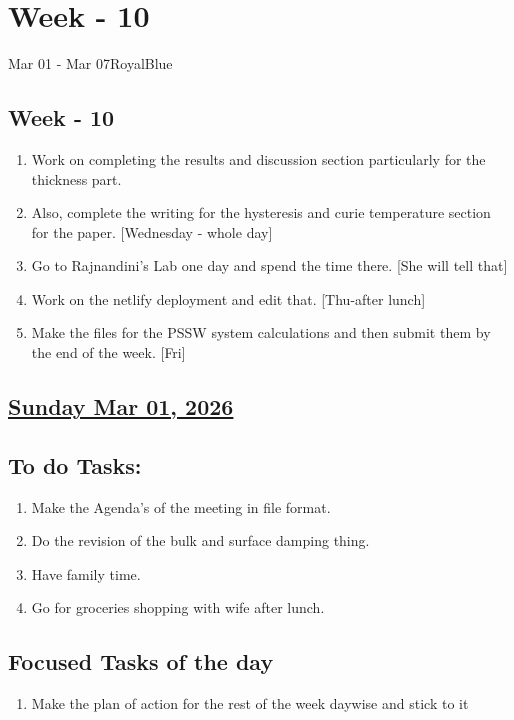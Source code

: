 \section{Week - 10}
\begin{physicsmodule}{Mar 01 - Mar 07}{RoyalBlue}
  \begin{lawbox}
    \subsection*{\sffamily\bfseries Week - 10}
    \begin{enumerate}
    \item Work on completing the results and discussion section particularly for the thickness part.
    \item Also, complete the writing for the hysteresis and curie temperature section for the paper. [Wednesday - whole day]
    \item Go to Rajnandini's Lab one day and spend the time there. [She will tell that]
    \item Work on the netlify deployment and edit that. [Thu-after lunch]
    \item Make the files for the PSSW system calculations and then submit them by the end of the week. [Fri]
\end{enumerate}
  \end{lawbox}
\end{physicsmodule}
\subsection*{\underline{Sunday Mar 01, 2026}}
\subsection*{To do Tasks:}
\begin{enumerate}
    \item Make the Agenda's of the meeting in file format.
    \item Do the revision of the bulk and surface damping thing. 
    \item Have family time.
    \item Go for groceries shopping with wife after lunch.
    
\end{enumerate}
\subsection*{Focused Tasks of the day}
\begin{enumerate}[\ding{212}]  
    \item Make the plan of action for the rest of the week daywise and stick to it
\end{enumerate}
